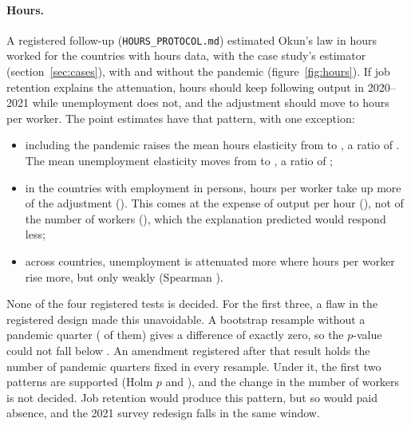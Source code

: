 \paragraph{Hours.} A registered follow-up (\texttt{HOURS\_PROTOCOL.md}) estimated Okun's law in
hours worked for the  countries with hours data, with the case study's
estimator (section~\ref{sec:cases}), with and without the pandemic
(figure~\ref{fig:hours}). If job retention explains the attenuation, hours should keep
following output in 2020--2021 while unemployment does not, and the adjustment should move
to hours per worker. The point estimates have that pattern, with one exception:
\begin{itemize}
  \item including the pandemic raises the mean hours elasticity from 
    to , a ratio of . The mean unemployment elasticity
    moves from  to , a ratio of ;
  \item in the  countries with employment in persons, hours per worker
    take up more of the adjustment (). This comes at the expense of output
    per hour (), not of the number of workers (), which the
    explanation predicted would respond less;
  \item across countries, unemployment is attenuated more where hours per worker rise
    more, but only weakly (Spearman ).
\end{itemize}
None of the four registered tests is decided. For the first three, a flaw in the
registered design made this unavoidable. A bootstrap resample without a pandemic quarter
( of them) gives a difference of exactly zero, so the $p$-value could
not fall below . An amendment registered after that result holds the
number of pandemic quarters fixed in every resample. Under it, the first two patterns are
supported (Holm $p$  and ), and the
change in the number of workers is not decided. Job retention would produce this pattern,
but so would paid absence, and the 2021 survey redesign falls in the same window.

